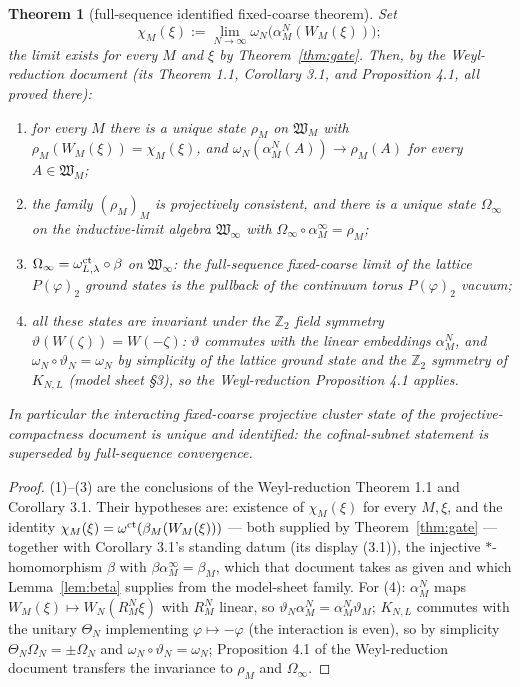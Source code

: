 \documentclass[11pt,a4paper]{article}
\theoremstyle{plain}
\newtheorem{theorem}{Theorem}[section]
\theoremstyle{definition}
\newcommand{\Z}{\mathbb{Z}}
\newcommand{\W}{\mathfrak W}
\begin{document}
\begin{theorem}[full-sequence identified fixed-coarse theorem]
\label{thm:final}
Set
\[
 \chi_M(\xi):=\lim_{N\to\infty}\omega_N\bigl(\alpha_M^N(W_M(\xi))\bigr);
\]
the limit exists for every $M$ and $\xi$ by Theorem~\ref{thm:gate}. Then,
by the Weyl-reduction document (its Theorem 1.1, Corollary 3.1, and
Proposition 4.1, all proved there):
\begin{enumerate}
\item for every $M$ there is a unique state $\rho_M$ on $\W_M$ with
$\rho_M(W_M(\xi))=\chi_M(\xi)$, and
$\omega_N(\alpha_M^N(A))\to\rho_M(A)$ for every $A\in\W_M$;
\item the family $(\rho_M)_M$ is projectively consistent, and there is a
unique state $\Omega_\infty$ on the inductive-limit algebra $\W_\infty$
with $\Omega_\infty\circ\alpha_M^\infty=\rho_M$;
\item $\Omega_\infty=\omega^{\rm ct}_{L,\lambda}\circ\beta$ on
$\W_\infty$: the full-sequence fixed-coarse limit of the lattice
$P(\varphi)_2$ ground states \emph{is} the pullback of the continuum
torus $P(\varphi)_2$ vacuum;
\item all these states are invariant under the $\Z_2$ field symmetry
$\vartheta(W(\zeta))=W(-\zeta)$: $\vartheta$ commutes with the linear
embeddings $\alpha_M^N$, and $\omega_N\circ\vartheta_N=\omega_N$ by
simplicity of the lattice ground state and the $\Z_2$ symmetry of
$K_{N,L}$ (model sheet \S3), so the Weyl-reduction Proposition 4.1
applies.
\end{enumerate}
In particular the interacting fixed-coarse projective cluster state of
the projective-compactness document is unique and identified: the
cofinal-subnet statement is superseded by full-sequence convergence.
\end{theorem}

\begin{proof}
(1)--(3) are the conclusions of the Weyl-reduction Theorem 1.1 and
Corollary 3.1. Their hypotheses are: existence of $\chi_M(\xi)$ for every
$M,\xi$, and the identity
$\chi_M(\xi)=\omega^{\rm ct}(\beta_M(W_M(\xi)))$ --- both supplied by
Theorem~\ref{thm:gate} --- together with Corollary 3.1's standing datum
(its display (3.1)), the injective $*$-homomorphism $\beta$ with
$\beta\alpha_M^\infty=\beta_M$, which that document takes as given and which
Lemma~\ref{lem:beta} supplies from the model-sheet family. For (4): $\alpha_M^N$ maps $W_M(\xi)\mapsto
W_N(R_M^N\xi)$ with $R_M^N$ linear, so
$\vartheta_N\alpha_M^N=\alpha_M^N\vartheta_M$; $K_{N,L}$ commutes with
the unitary $\Theta_N$ implementing $\varphi\mapsto-\varphi$ (the
interaction is even), so by simplicity $\Theta_N\Omega_N=\pm\Omega_N$
and $\omega_N\circ\vartheta_N=\omega_N$; Proposition 4.1 of the
Weyl-reduction document transfers the invariance to $\rho_M$ and
$\Omega_\infty$.
\end{proof}
\end{document}
